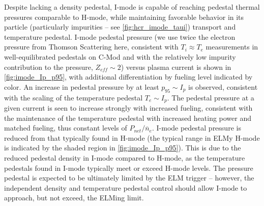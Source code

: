 Despite lacking a density pedestal, I-mode is capable of reaching pedestal thermal pressures comparable to H-mode, while maintaining favorable behavior  in its particle (particularly impurities -- see \cref{fig:hcr_imode_taui}) transport and temperature pedestal.  I-mode pedestal pressure (we use twice the electron pressure from Thomson Scattering here, consistent with $T_i \approx T_e$ measurements in well-equilibrated pedestals on C-Mod \cite{Hubbard2011} and with the relatively low impurity contribution to the pressure, $Z_{eff} \sim 2$) versus plasma current is shown in \cref{fig:imode_Ip_p95}, with additional differentiation by fueling level indicated by color.  An increase in pedestal pressure by at least $p_{95} \sim I_p$ is observed, consistent with the scaling of the temperature pedestal $T_e \sim I_p$.  The pedestal pressure at a given current is seen to increase strongly with increased fueling, consistent with the maintenance of the temperature pedestal with increased heating power and matched fueling, thus constant levels of $P_{net}/\overline{n}_e$.  I-mode pedestal pressure is reduced from that typically found in H-mode (the typical range in ELMy H-mode is indicated by the shaded region in \cref{fig:imode_Ip_p95}).  This is due to the reduced pedestal density in I-mode compared to H-mode, as the temperature pedestals found in I-mode typically meet or exceed H-mode levels.  The pressure pedestal is expected to be ultimately limited by the ELM trigger -- however, the independent density and temperature pedestal control should allow I-mode to approach, but not exceed, the ELMing limit.

\begin{figure}[t]
 \pushtooutside
\end{figure}

